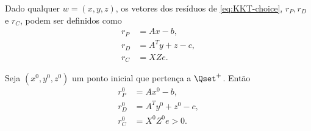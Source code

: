 Dado qualquer $w = (x,y,z)$, os vetores dos resíduos
de \eqref{eq:KKT-choice}, $r_P, r_D$ e $r_C$, podem ser definidos como
\begin{subequations}
\label{eq:KKT-residuals}
\begin{align} 
r_P & =Ax-b,\label{eq:KKT-residuals-a}\\ 
r_D & =A^Ty + z - c,\label{eq:KKT-residuals-b}\\
r_C  &=XZe. \label{eq:KKT-residuals-c}
\end{align} 
\end{subequations}



Seja 
$(x^0,y^0,z^0)$ um ponto inicial que pertença a $\Qset^+$. Então
\begin{align*} 
r^0_P & =Ax^0-b,\\ 
r^0_D & =A^Ty^0 + z^0 - c, \\
r^0_C  &=X^0Z^0 e > 0. 
\end{align*}
 
% 
% 
% 
% 

